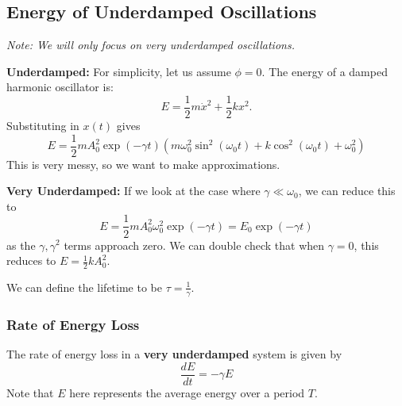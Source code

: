 \documentclass{article}
\begin{document}
\subsection{Energy of Underdamped Oscillations}
\textit{Note: We will only focus on very underdamped oscillations.}

\textbf{Underdamped:} For simplicity, let us assume $\phi=0.$ The energy of a damped harmonic oscillator is: 
\begin{equation}
    E = \frac{1}{2}m\dot{x}^2 + \frac{1}{2}kx^2.
\end{equation}
Substituting in $x(t)$ gives 
\begin{equation}
    E = \frac{1}{2}mA_0^2\exp\left(-\gamma t\right)(m\omega_0^2\sin^2(\omega_0t)+k\cos^2(\omega_0t)+\omega_0^2)
\end{equation}
This is very messy, so we want to make approximations.

\textbf{Very Underdamped:} If we look at the case where $\gamma \ll \omega_0$, we can reduce this to
\begin{equation}
    \boxed{E = \frac{1}{2}mA_0^2\omega_0^2\exp\left(-\gamma t\right) = E_0\exp(-\gamma t)}
\end{equation}
as the $\gamma,\gamma^2$ terms approach zero. We can double check that when $\gamma = 0$, this reduces to $E = \frac{1}{2}kA_0^2.$

We can define the lifetime to be $\tau = \frac{1}{\gamma}$.
\subsubsection{Rate of Energy Loss}
The rate of energy loss in a \textbf{very underdamped} system is given by 
\begin{equation}
    \frac{dE}{dt} = -\gamma E
\end{equation}
Note that $E$ here represents the average energy over a period $T$.
\end{document}
